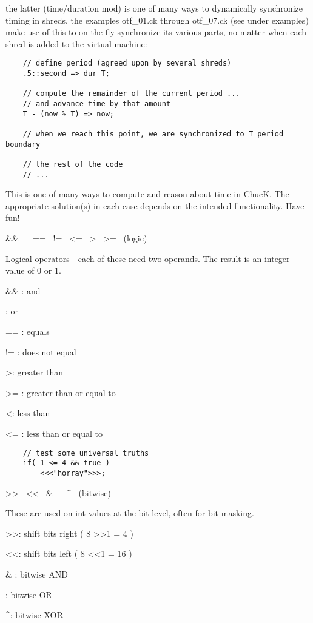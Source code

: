 the latter (time/duration mod) is one of many ways to dynamically synchronize timing in shreds. the examples otf\_01.ck through otf\_07.ck (see under examples) make use of this to on-the-fly synchronize its various parts, no matter when each shred is added to the virtual machine:
\begin{verbatim}
    // define period (agreed upon by several shreds)
    .5::second => dur T;

    // compute the remainder of the current period ...
    // and advance time by that amount
    T - (now % T) => now;

    // when we reach this point, we are synchronized to T period boundary
    
    // the rest of the code
    // ...
\end{verbatim}

This is one of many ways to compute and reason about time in ChucK. The appropriate solution(s) in each case depends on the intended functionality. Have fun!
 

\&\&~ \textbar\textbar~ ==~ !=~ \textless=~ \textgreater~ \textgreater=~ (logic)

Logical operators - each of these need two operands.  The result is an integer value of 0 or 1.
\begin{chuckitemize}
\item \&\& : and
\item \textbar\textbar : or
\item == : equals
\item != : does not equal
\item \textgreater : greater than
\item \textgreater= : greater than or equal to
\item \textless : less than
\item \textless= : less than or equal to
\end{chuckitemize}
\begin{verbatim}
    // test some universal truths
    if( 1 <= 4 && true )
        <<<"horray">>>;
\end{verbatim}
 

\textgreater\textgreater~ \textless\textless~ \&~ \textbar~ \textasciicircum~ (bitwise)

These are used on int values at the bit level, often for bit masking.
\begin{chuckitemize}
\item \textgreater\textgreater : shift bits right ( 8 \textgreater\textgreater 1 = 4 )
\item \textless\textless : shift bits left ( 8 \textless\textless 1 = 16 )
\item \& : bitwise AND
\item \textbar : bitwise OR
\item \textasciicircum : bitwise XOR
\end{chuckitemize}


